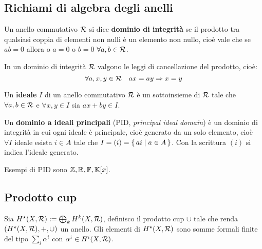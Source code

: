 \subsection{Richiami di algebra degli anelli}

\begin{definition}
  Un anello commutativo $ \mathcal{R} $ si dice \textbf{dominio di integrità}
  se il prodotto tra qualsiasi coppia di elementi non nulli è un elemento non nullo, cioè
  vale che se $ ab = 0 $ allora o $ a = 0 $ o $ b = 0 $ $ \forall a, b \in \mathcal{R} $.
\end{definition}

\begin{proposition}
  In un dominio di integrità $ \mathcal{R} $ valgono le leggi di cancellazione del prodotto, cioè:
  \[
    \forall a,x,y \in \mathcal{R} \quad ax = ay \Rightarrow x = y
  \]
\end{proposition}

\begin{definition}
  Un \textbf{ideale} $ I $ di un anello commutativo $ \mathcal{R} $ è un
  sottoinsieme di $ \mathcal{R} $ tale che $ \forall a,b \in \mathcal{R} $ e $ \forall x,y \in I $ sia
  $ a x + b y \in I $.
\end{definition}

\begin{definition}
  Un \textbf{dominio a ideali principali}
  (PID, \emph{principal ideal domain}) è un dominio di integrità in cui ogni
  ideale è principale, cioè generato da un solo
  elemento, cioè $ \forall I $ ideale esista $ i \in A $ tale che
  $ I = (i) = \set{a i | a \in A} $. Con la scrittura $ (i) $ si indica l'ideale
  generato.
\end{definition}

\begin{example}
  Esempi di PID sono $ \mathbb{Z}, \mathbb{R}^{}, \mathbb{F}, \mathbb{K}[x] $.
\end{example}

\subsection{Prodotto cup}

Sia $ H^\star (X,\mathcal{R}) := \bigoplus_k H^k(X,\mathcal{R}) $, definisco il prodotto
cup $ \cup $ tale che renda $ (H^\star (X,\mathcal{R}), +, \cup) $ un anello.
Gli elementi di $ H^\star (X,\mathcal{R}) $ sono somme formali finite
del tipo $ \sum_i \alpha^i $ con $ \alpha^i \in H^i(X, \mathcal{R}) $.

